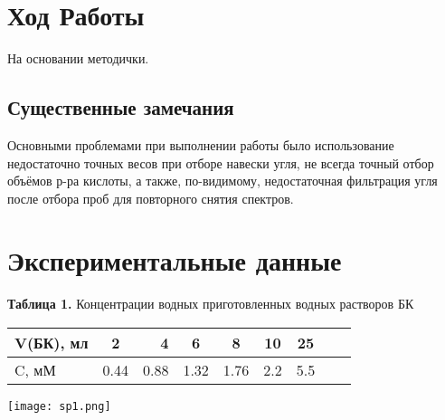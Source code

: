 \documentclass[a4paper]{article}
\begin{document}
\par \vspace{1cm}

\section{\LARGE Ход Работы}

На основании методички. \par \vspace{0.3cm}
\subsection{\large Существенные замечания} \par
Основными проблемами при выполнении работы было использование недостаточно точных весов при отборе навески угля, не всегда точный отбор объёмов р-ра кислоты, а также, по-видимому, недостаточная фильтрация угля после отбора проб для повторного снятия спектров.

\section{\LARGE \textbf{Экспериментальные данные}}
\vspace{1.5 cm}

\par

\begin{center}
\textbf{Таблица 1.} Концентрации водных приготовленных водных растворов БК

\vspace{0.3cm}
\begin{tabular}{|l|c|r|c|c|c|c|c|c|}
    \hline
    V(БК), мл & 2 & 4 & 6 & 8 & 10 & 25\\
    \hline
    C, мМ & 0.44 & 0.88 & 1.32 & 1.76 & 2.2 & 5.5\\
    \hline
     
\end{tabular}
\end{center}

\graphicspath{{./images/}}
		\begin{center}
		
			\texttt{[image: sp1.png]}
	

	\par
 \vspace{0.3cm}
 \end{center}
\vspace{0.3cm}
\par
\end{document}
